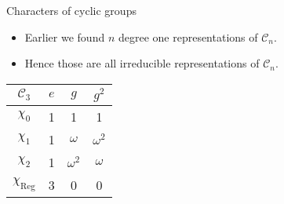 \documentclass[10pt]{beamer}
\newcommand{\Cyc}{\mathcal{C}}
\newcommand{\Reg}{\text{Reg}}
\begin{document}
	\begin{frame}[allowframebreaks]{Characters of cyclic groups}
		
		\begin{itemize}
			\item Earlier we found $n$ degree one representations of $\Cyc_n$.
			\item Hence those are all irreducible representations of $\Cyc_n$.\pause
		\end{itemize}
		\begin{example}[$\Cyc_3$]
			\begin{table}
				\centering
				\begin{tabular}{c | c c c}
					$\Cyc_3$ & $e$ & $g$        & $g^2$      \\ \hline
					$\chi_0$          & 1   & 1          & 1          \\
					$\chi_1$          & 1   & $\omega$   & $\omega^2$ \\
					$\chi_2$          & 1   & $\omega^2$ & $\omega$ \\ \hline\hline
					$\chi_\text{Reg}$ & 3 & 0 & 0
				\end{tabular}
			\end{table}
		\end{example}
		
	\end{frame}
	
\end{document}
